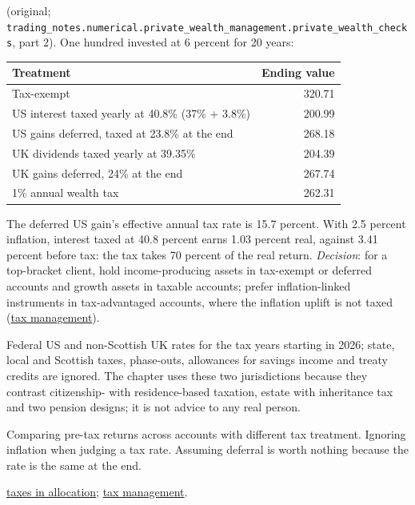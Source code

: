 \begin{qfmethod}
 (original; \nolinkurl{trading_notes.numerical.private_wealth_management.private_wealth_checks}, part 2). One hundred invested at 6 percent for 20 years:
\begin{center}\small
\begin{tabular}{@{}lr@{}}
\toprule
Treatment & Ending value \\
\midrule
Tax-exempt & 320.71 \\
US interest taxed yearly at 40.8\% (37\% + 3.8\%) & 200.99 \\
US gains deferred, taxed at 23.8\% at the end & 268.18 \\
UK dividends taxed yearly at 39.35\% & 204.39 \\
UK gains deferred, 24\% at the end & 267.74 \\
1\% annual wealth tax & 262.31 \\
\bottomrule
\end{tabular}
\end{center}
The deferred US gain's effective annual tax rate is 15.7 percent. With 2.5 percent inflation, interest taxed at 40.8 percent earns 1.03 percent real, against 3.41 percent before tax: the tax takes 70 percent of the real return. \emph{Decision}: for a top-bracket client, hold income-producing assets in tax-exempt or deferred accounts and growth assets in taxable accounts; prefer inflation-linked instruments in tax-advantaged accounts, where the inflation uplift is not taxed (\hyperref[meth:tax-in-planning]{tax management}).

 Federal US and non-Scottish UK rates for the tax years starting in 2026; state, local and Scottish taxes, phase-outs, allowances for savings income and treaty credits are ignored. The chapter uses these two jurisdictions because they contrast citizenship- with residence-based taxation, estate with inheritance tax and two pension designs; it is not advice to any real person.

 Comparing pre-tax returns across accounts with different tax treatment. Ignoring inflation when judging a tax rate. Assuming deferral is worth nothing because the rate is the same at the end.

 \hyperref[meth:allocation-constraints-taxes-revision]{taxes in allocation}; \hyperref[meth:tax-in-planning]{tax management}.

\end{qfmethod}

